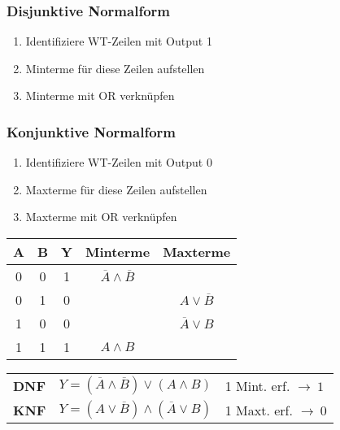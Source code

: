 \subsubsection{Disjunktive Normalform}
\begin{enumerate}
    \item Identifiziere WT-Zeilen mit Output 1
    \item Minterme für diese Zeilen aufstellen
    \item Minterme mit OR verknüpfen
\end{enumerate}
\subsubsection{Konjunktive Normalform}
\begin{enumerate}
    \item Identifiziere WT-Zeilen mit Output 0
    \item Maxterme für diese Zeilen aufstellen
    \item Maxterme mit OR verknüpfen
\end{enumerate}
\begin{center}
        \begin{tabular}{|c c|c|c|c|}
            \hline
            A & B & Y & Minterme & Maxterme\\
            \hline
            0 & 0 & 1 & $\overline{A} \land \overline{B}$ & \\
            0 & 1 & 0 & & $A \lor \overline{B}$\\
            1 & 0 & 0 & & $\overline{A} \lor B$\\
            1 & 1 & 1 & $A \land B$ & \\
            \hline
        \end{tabular}
\end{center}

\begin{flushleft}
    \renewcommand{\arraystretch}{1.5}
    \begin{tabular}{l l l}
        \textbf{DNF} & $Y = (\overline{A} \land \overline{B}) \lor (A \land B)$ & {\tiny 1 Mint. erf. $\rightarrow~1$}\\
        \textbf{KNF} & $Y = (A \lor \overline{B}) \land (\overline{A} \lor B)$ & {\tiny 1 Maxt. erf. $\rightarrow~0$}\\
    \end{tabular}
\end{flushleft}